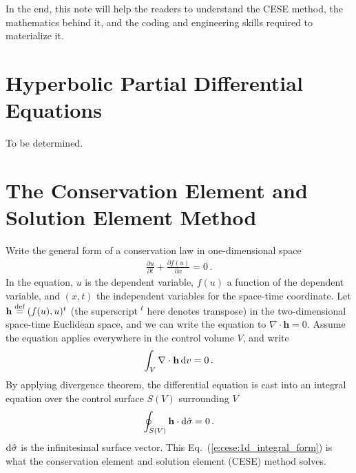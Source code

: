\documentclass{turgon}
\begin{document}
In the end, this note will help the readers to understand the CESE method, the
mathematics behind it, and the coding and engineering skills required to
materialize it.

\chapter{Hyperbolic Partial Differential Equations}
\label{c:hyper}

To be determined.


\chapter{The Conservation Element and Solution Element Method}
\label{c:cese}


Write the general form of a conservation law in one-dimensional space
\begin{align*}
  \frac{\partial u}{\partial t} + \frac{\partial f(u)}{\partial x} = 0
  \,.
\end{align*}
In the equation, $u$ is the dependent variable, $f(u)$ a function of the
dependent variable, and $(x, t)$ the independent variables for the space-time
coordinate.  Let $\mathbf{h} \defeq (f(u),u)^t$ (the superscript ${}^t$ here
denotes transpose) in the two-dimensional space-time Euclidean space, and we
can write the equation to $\nabla\cdot\mathbf{h} = 0$.  Assume the equation
applies everywhere in the control volume $V$, and write
\begin{align*}
  \int_V\nabla\cdot\mathbf{h}\mathop{}\!\mathrm{d} v = 0
  \,.
\end{align*}
By applying divergence theorem, the differential equation is cast into an
integral equation over the control surface $S(V)$ surrounding $V$
\begin{align}
  \oint_{S(V)}\mathbf{h}\cdot\mathop{}\!\mathrm{d}\hat{\sigma} = 0
  \,.
  \label{e:cese:1d_integral_form}
\end{align}
$\mathop{}\!\mathrm{d}\hat{\sigma}$ is the infinitesimal surface vector.  This
Eq.~(\ref{e:cese:1d_integral_form}) is what the conservation element and
solution element (CESE) method solves.
\end{document}
